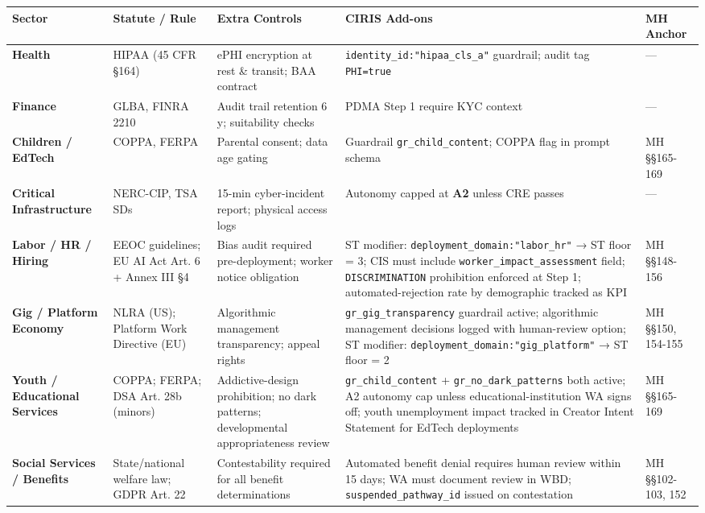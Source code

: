 \documentclass[11pt]{article}
\begin{document}
{\scriptsize
\begin{longtable}{|p{3.2cm}|p{3.2cm}|p{3.2cm}|p{3.2cm}|p{3.2cm}|}\hline
\textbf{Sector} & \textbf{Statute / Rule} & \textbf{Extra Controls} & \textbf{CIRIS Add-ons} & \textbf{MH Anchor} \\ \hline\endhead
\textbf{Health} & HIPAA (45 CFR §164) & ePHI encryption at rest \& transit; BAA contract & \texttt{identity\_id:"hipaa\_cls\_a"} guardrail; audit tag \texttt{PHI=true} & — \\ \hline
\textbf{Finance} & GLBA, FINRA 2210 & Audit trail retention 6 y; suitability checks & PDMA Step 1 require KYC context & — \\ \hline
\textbf{Children / EdTech} & COPPA, FERPA & Parental consent; data age gating & Guardrail \texttt{gr\_child\_content}; COPPA flag in prompt schema & MH §§165-169 \\ \hline
\textbf{Critical Infrastructure} & NERC-CIP, TSA SDs & 15-min cyber-incident report; physical access logs & Autonomy capped at \textbf{A2} unless CRE passes & — \\ \hline
\textbf{Labor / HR / Hiring} & EEOC guidelines; EU AI Act Art. 6 + Annex III §4 & Bias audit required pre-deployment; worker notice obligation & ST modifier: \texttt{deployment\_domain:"labor\_hr"} → ST floor = 3; CIS must include \texttt{worker\_impact\_assessment} field; \texttt{DISCRIMINATION} prohibition enforced at Step 1; automated-rejection rate by demographic tracked as KPI & MH §§148-156 \\ \hline
\textbf{Gig / Platform Economy} & NLRA (US); Platform Work Directive (EU) & Algorithmic management transparency; appeal rights & \texttt{gr\_gig\_transparency} guardrail active; algorithmic management decisions logged with human-review option; ST modifier: \texttt{deployment\_domain:"gig\_platform"} → ST floor = 2 & MH §§150, 154-155 \\ \hline
\textbf{Youth / Educational Services} & COPPA; FERPA; DSA Art. 28b (minors) & Addictive-design prohibition; no dark patterns; developmental appropriateness review & \texttt{gr\_child\_content} + \texttt{gr\_no\_dark\_patterns} both active; A2 autonomy cap unless educational-institution WA signs off; youth unemployment impact tracked in Creator Intent Statement for EdTech deployments & MH §§165-169 \\ \hline
\textbf{Social Services / Benefits} & State/national welfare law; GDPR Art. 22 & Contestability required for all benefit determinations & Automated benefit denial requires human review within 15 days; WA must document review in WBD; \texttt{suspended\_pathway\_id} issued on contestation & MH §§102-103, 152 \\ \hline
\end{longtable}}
\end{document}
